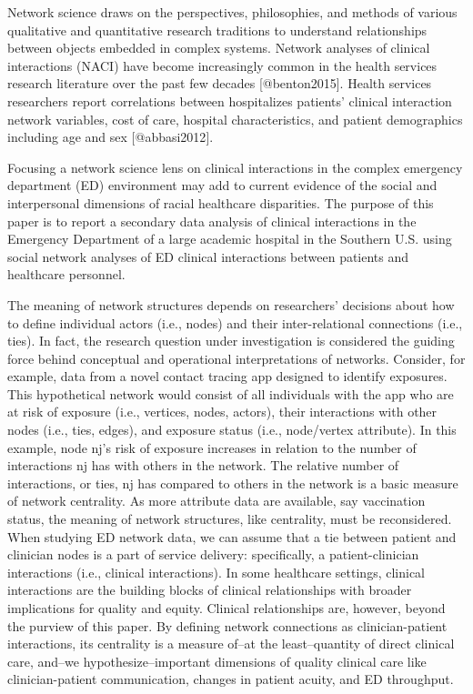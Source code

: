 \documentclass[
]{article}
\begin{document}
Network science draws on the perspectives, philosophies, and methods of
various qualitative and quantitative research traditions to understand
relationships between objects embedded in complex systems. Network
analyses of clinical interactions (NACI) have become increasingly common
in the health services research literature over the past few decades
{[}@benton2015{]}. Health services researchers report correlations
between hospitalizes patients' clinical interaction network variables,
cost of care, hospital characteristics, and patient demographics
including age and sex {[}@abbasi2012{]}.

Focusing a network science lens on clinical interactions in the complex
emergency department (ED) environment may add to current evidence of the
social and interpersonal dimensions of racial healthcare disparities.
The purpose of this paper is to report a secondary data analysis of
clinical interactions in the Emergency Department of a large academic
hospital in the Southern U.S. using social network analyses of ED
clinical interactions between patients and healthcare personnel.

The meaning of network structures depends on researchers' decisions
about how to define individual actors (i.e., nodes) and their
inter-relational connections (i.e., ties). In fact, the research
question under investigation is considered the guiding force behind
conceptual and operational interpretations of networks. Consider, for
example, data from a novel contact tracing app designed to identify
exposures. This hypothetical network would consist of all individuals
with the app who are at risk of exposure (i.e., vertices, nodes,
actors), their interactions with other nodes (i.e., ties, edges), and
exposure status (i.e., node/vertex attribute). In this example, node
nj's risk of exposure increases in relation to the number of
interactions nj has with others in the network. The relative number of
interactions, or ties, nj has compared to others in the network is a
basic measure of network centrality. As more attribute data are
available, say vaccination status, the meaning of network structures,
like centrality, must be reconsidered. When studying ED network data, we
can assume that a tie between patient and clinician nodes is a part of
service delivery: specifically, a patient-clinician interactions (i.e.,
clinical interactions). In some healthcare settings, clinical
interactions are the building blocks of clinical relationships with
broader implications for quality and equity. Clinical relationships are,
however, beyond the purview of this paper. By defining network
connections as clinician-patient interactions, its centrality is a
measure of--at the least--quantity of direct clinical care, and--we
hypothesize--important dimensions of quality clinical care like
clinician-patient communication, changes in patient acuity, and ED
throughput.
\end{document}
